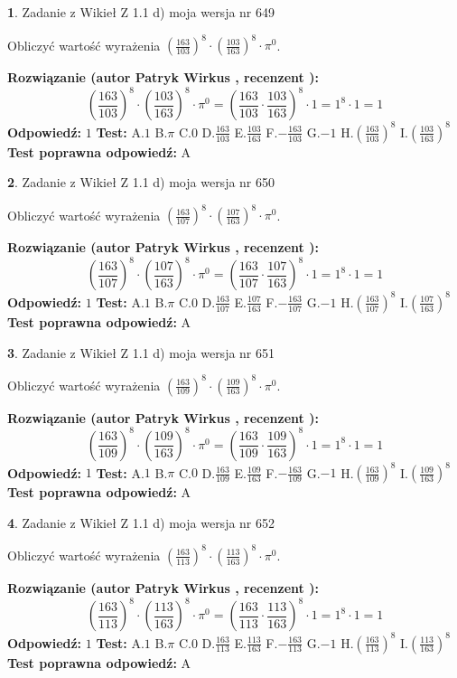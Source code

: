 \documentclass[12pt, a4paper]{article}
\theoremstyle{definition} %
\newtheorem{zad}{}
\newcommand{\zadStart}[1]{\begin{zad}#1\newline}
\newcommand{\zadStop}{\end{zad}}
\newcommand{\rozwStart}[2]{\noindent \textbf{Rozwiązanie (autor #1 , recenzent #2): }\newline}
\newcommand{\rozwStop}{\newline}
\newcommand{\odpStart}{\noindent \textbf{Odpowiedź:}\newline}
\newcommand{\odpStop}{\newline}
\newcommand{\testStart}{\noindent \textbf{Test:}\newline}
\newcommand{\testStop}{\newline}
\newcommand{\kluczStart}{\noindent \textbf{Test poprawna odpowiedź:}\newline}
\newcommand{\kluczStop}{\newline}
\begin{document}
\zadStart{Zadanie z Wikieł Z 1.1 d) moja wersja nr 649}

Obliczyć wartość wyrażenia $(\frac{163}{103})^{8} \cdot (\frac{103}{163})^{8} \cdot \pi^{0}$.
\zadStop
\rozwStart{Patryk Wirkus}{}
$$(\frac{163}{103})^{8} \cdot (\frac{103}{163})^{8} \cdot \pi^{0} = (\frac{163}{103} \cdot \frac{103}{163})^{8} \cdot 1 = 1^{8} \cdot 1 = 1$$
\rozwStop
\odpStart
$1$
\odpStop
\testStart
A.$1$ B.$\pi$ C.$0$ D.$\frac{163}{103}$ E.$\frac{103}{163}$
F.$-\frac{163}{103}$ G.$-1$
H.$(\frac{163}{103})^{8}$
I.$(\frac{103}{163})^{8}$
\testStop
\kluczStart
A
\kluczStop



\zadStart{Zadanie z Wikieł Z 1.1 d) moja wersja nr 650}

Obliczyć wartość wyrażenia $(\frac{163}{107})^{8} \cdot (\frac{107}{163})^{8} \cdot \pi^{0}$.
\zadStop
\rozwStart{Patryk Wirkus}{}
$$(\frac{163}{107})^{8} \cdot (\frac{107}{163})^{8} \cdot \pi^{0} = (\frac{163}{107} \cdot \frac{107}{163})^{8} \cdot 1 = 1^{8} \cdot 1 = 1$$
\rozwStop
\odpStart
$1$
\odpStop
\testStart
A.$1$ B.$\pi$ C.$0$ D.$\frac{163}{107}$ E.$\frac{107}{163}$
F.$-\frac{163}{107}$ G.$-1$
H.$(\frac{163}{107})^{8}$
I.$(\frac{107}{163})^{8}$
\testStop
\kluczStart
A
\kluczStop



\zadStart{Zadanie z Wikieł Z 1.1 d) moja wersja nr 651}

Obliczyć wartość wyrażenia $(\frac{163}{109})^{8} \cdot (\frac{109}{163})^{8} \cdot \pi^{0}$.
\zadStop
\rozwStart{Patryk Wirkus}{}
$$(\frac{163}{109})^{8} \cdot (\frac{109}{163})^{8} \cdot \pi^{0} = (\frac{163}{109} \cdot \frac{109}{163})^{8} \cdot 1 = 1^{8} \cdot 1 = 1$$
\rozwStop
\odpStart
$1$
\odpStop
\testStart
A.$1$ B.$\pi$ C.$0$ D.$\frac{163}{109}$ E.$\frac{109}{163}$
F.$-\frac{163}{109}$ G.$-1$
H.$(\frac{163}{109})^{8}$
I.$(\frac{109}{163})^{8}$
\testStop
\kluczStart
A
\kluczStop



\zadStart{Zadanie z Wikieł Z 1.1 d) moja wersja nr 652}

Obliczyć wartość wyrażenia $(\frac{163}{113})^{8} \cdot (\frac{113}{163})^{8} \cdot \pi^{0}$.
\zadStop
\rozwStart{Patryk Wirkus}{}
$$(\frac{163}{113})^{8} \cdot (\frac{113}{163})^{8} \cdot \pi^{0} = (\frac{163}{113} \cdot \frac{113}{163})^{8} \cdot 1 = 1^{8} \cdot 1 = 1$$
\rozwStop
\odpStart
$1$
\odpStop
\testStart
A.$1$ B.$\pi$ C.$0$ D.$\frac{163}{113}$ E.$\frac{113}{163}$
F.$-\frac{163}{113}$ G.$-1$
H.$(\frac{163}{113})^{8}$
I.$(\frac{113}{163})^{8}$
\testStop
\kluczStart
A
\kluczStop
\end{document}
